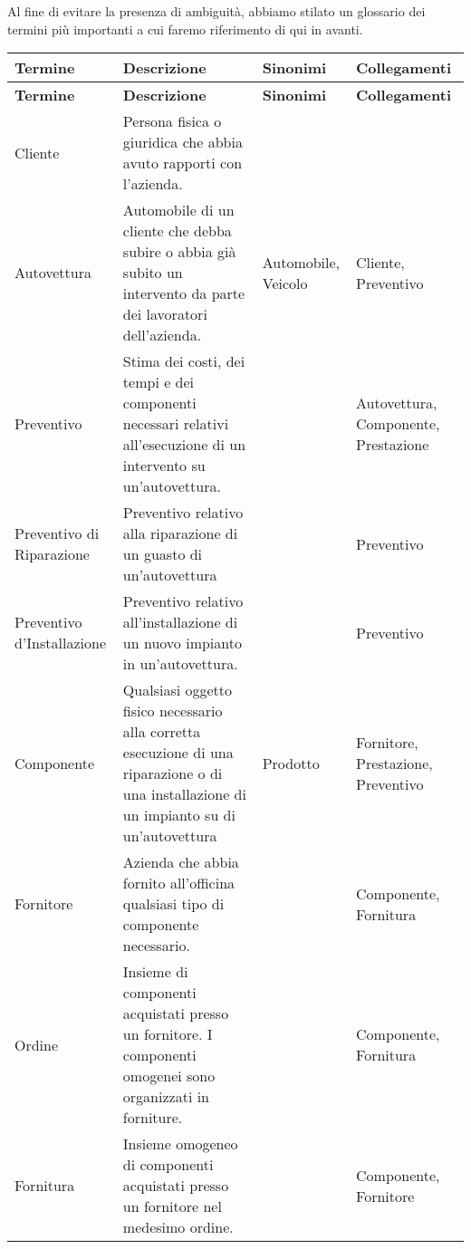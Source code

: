 		Al fine di evitare la presenza di ambiguità, abbiamo stilato un glossario dei termini più importanti a cui faremo riferimento di qui in avanti.
						
		\begin{longtable}{| p{2.5cm} | p{4.5cm} | p{2cm} | p{2.5cm} |}
				
			\hline
			\textbf{Termine} & 
			\textbf{Descrizione} & 
			\textbf{Sinonimi} & 
			\textbf{Collegamenti} \\
			
			\endfirsthead
				
			\hline
			\textbf{Termine} & 
			\textbf{Descrizione} & 
			\textbf{Sinonimi} & 
			\textbf{Collegamenti} \\
			
			\endhead
			
			\hline
			Cliente & 
			Persona fisica o giuridica che abbia avuto rapporti con l'azienda.
			&&\\ \hline
			Autovettura &
			Automobile di un cliente che debba subire o abbia già subito un intervento da parte dei lavoratori dell’azienda. &
			Automobile, Veicolo &
			Cliente, Preventivo
			\\ \hline
			Preventivo &
			Stima dei costi, dei tempi e dei componenti necessari relativi all’esecuzione di un intervento su un’autovettura. & &
			Autovettura, Componente, Prestazione
			\\ \hline
			Preventivo di Riparazione &
			Preventivo relativo alla riparazione di un guasto di un’autovettura & &
			Preventivo 
			\\ \hline
			Preventivo d'Installazione & 
			Preventivo relativo all’installazione di un nuovo impianto in un’autovettura. & &
			Preventivo
			\\ \hline
			Componente &
			Qualsiasi oggetto fisico necessario alla corretta esecuzione di una riparazione o di una installazione di un impianto su di un’autovettura &
			Prodotto &
			Fornitore, Prestazione, Preventivo
			\\ \hline
			Fornitore & 
			Azienda che abbia fornito all’officina qualsiasi tipo di componente necessario. & &
			Componente, Fornitura
			\\ \hline
			Ordine &
			Insieme di componenti acquistati presso un fornitore. I componenti omogenei sono organizzati in forniture. &
			&
			Componente, Fornitura
			\\ \hline
			Fornitura & 
			Insieme omogeneo di componenti acquistati presso un fornitore nel medesimo ordine. &
			&
			Componente, Fornitore

\end{longtable}

